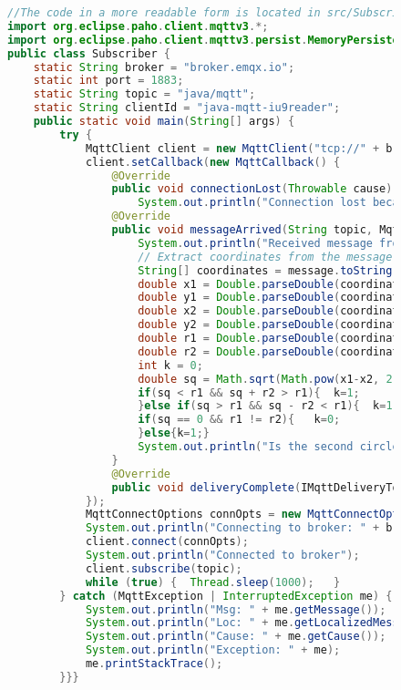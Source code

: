 \documentclass[a4paper, 14pt]{extarticle}
\begin{document}
\begin{figure}[!htb]
\begin{lstlisting}[language={java},caption={Subscriber.java},label={lst:code2}]
//The code in a more readable form is located in src/Subscriber.java
import org.eclipse.paho.client.mqttv3.*;
import org.eclipse.paho.client.mqttv3.persist.MemoryPersistence;
public class Subscriber {
    static String broker = "broker.emqx.io";
    static int port = 1883;
    static String topic = "java/mqtt";
    static String clientId = "java-mqtt-iu9reader";
    public static void main(String[] args) {
        try {
            MqttClient client = new MqttClient("tcp://" + broker + ":" + port, clientId, new MemoryPersistence());
            client.setCallback(new MqttCallback() {
                @Override
                public void connectionLost(Throwable cause) {
                    System.out.println("Connection lost because: " + cause);   }
                @Override
                public void messageArrived(String topic, MqttMessage message) throws Exception {
                    System.out.println("Received message from topic: " + topic + ", message: " + message.toString());
                    // Extract coordinates from the message
                    String[] coordinates = message.toString().split(", ");
                    double x1 = Double.parseDouble(coordinates[0]);
                    double y1 = Double.parseDouble(coordinates[1]);
                    double x2 = Double.parseDouble(coordinates[2]);
                    double y2 = Double.parseDouble(coordinates[3]);
                    double r1 = Double.parseDouble(coordinates[4]);
                    double r2 = Double.parseDouble(coordinates[5]);
                    int k = 0;
                    double sq = Math.sqrt(Math.pow(x1-x2, 2) + Math.pow(y1-y2, 2));
                    if(sq < r1 && sq + r2 > r1){  k=1;
                    }else if(sq > r1 && sq - r2 < r1){  k=1;  }
                    if(sq == 0 && r1 != r2){   k=0;   
                    }else{k=1;}
                    System.out.println("Is the second circle nested inside the first?:" + k);
                }
                @Override
                public void deliveryComplete(IMqttDeliveryToken token) {        }
            });
            MqttConnectOptions connOpts = new MqttConnectOptions();
            System.out.println("Connecting to broker: " + broker);
            client.connect(connOpts);
            System.out.println("Connected to broker");
            client.subscribe(topic);
            while (true) {  Thread.sleep(1000);   }
        } catch (MqttException | InterruptedException me) {
            System.out.println("Msg: " + me.getMessage());
            System.out.println("Loc: " + me.getLocalizedMessage());
            System.out.println("Cause: " + me.getCause());
            System.out.println("Exception: " + me);
            me.printStackTrace();
        }}}
\end{lstlisting}
\end{figure}
\end{document}
